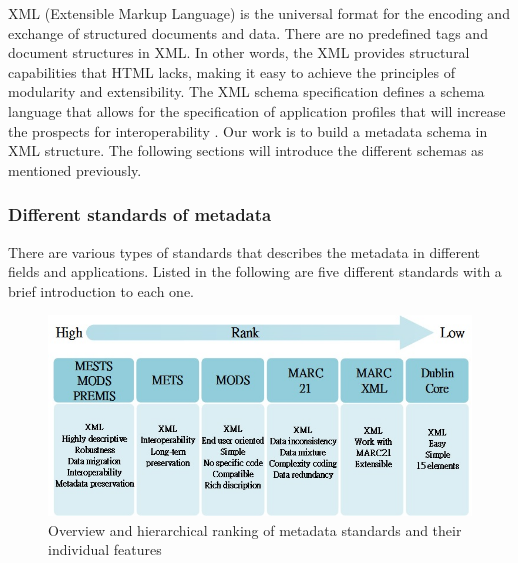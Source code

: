 XML (Extensible Markup Language) is the universal format for the encoding and exchange of structured documents and data. There are no predefined tags and document structures in XML. In other words, the XML provides structural capabilities that HTML lacks, making it easy to achieve the principles of modularity and extensibility. The XML schema specification defines a schema language that allows for the specification of application profiles that will increase the prospects for interoperability \cite{duval2002metadata}. Our work is to build a metadata schema in XML structure. The following sections will introduce the different schemas as mentioned previously.


\subsubsection*{Different standards of metadata}
\label{sec:mets}
There are various types of standards that describes the metadata in different fields and applications. Listed in the following are five different standards with a brief introduction to each one.

\begin{figure}		
	\begin{center}
		\includegraphics[width=1.8\columnwidth]{EagleUnit_Background_Chart_1}
	\end{center}
	\caption{Overview and hierarchical ranking of metadata standards and their individual features}
\end{figure}


